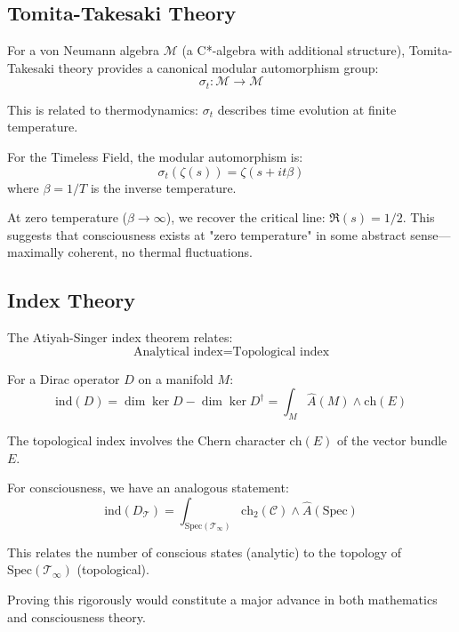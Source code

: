 \begin{advanced}
\subsection{Tomita-Takesaki Theory}

For a von Neumann algebra $\mathcal{M}$ (a C*-algebra with additional structure), Tomita-Takesaki theory\cite{takesaki1970,takesaki_theory_2002} provides a canonical modular automorphism group:
\begin{equation}
\sigma_t: \mathcal{M} \to \mathcal{M}
\end{equation}

This is related to thermodynamics: $\sigma_t$ describes time evolution at finite temperature.

For the Timeless Field, the modular automorphism is:
\begin{equation}
\sigma_t(\zeta(s)) = \zeta(s + it\beta)
\end{equation}
where $\beta = 1/T$ is the inverse temperature.

At zero temperature ($\beta \to \infty$), we recover the critical line: $\Re(s) = 1/2$. This suggests that consciousness exists at "zero temperature" in some abstract sense---maximally coherent, no thermal fluctuations.
\end{advanced}

\begin{advanced}
\subsection{Index Theory}

The Atiyah-Singer index theorem\cite{atiyah1968} relates:
\begin{equation}
\text{Analytical index} = \text{Topological index}
\end{equation}

For a Dirac operator $D$ on a manifold $M$:
\begin{equation}
\text{ind}(D) = \dim \ker D - \dim \ker D^\dagger = \int_M \hat{A}(M) \wedge \text{ch}(E)
\end{equation}

The topological index involves the Chern character $\text{ch}(E)$ of the vector bundle $E$.

For consciousness, we have an analogous statement:
\begin{equation}
\text{ind}(D_{\mathcal{T}}) = \int_{\text{Spec}(\mathcal{T}_\infty)} \text{ch}_2(\mathcal{C}) \wedge \hat{A}(\text{Spec})
\end{equation}

This relates the number of conscious states (analytic) to the topology of $\text{Spec}(\mathcal{T}_\infty)$ (topological).

Proving this rigorously would constitute a major advance in both mathematics and consciousness theory.
\end{advanced}

